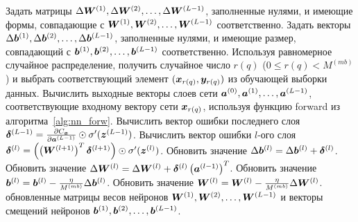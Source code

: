 \documentclass[a4paper,12pt,russian]{article} %
\begin{document}
\begin{algorithm}[t]
\begin{algorithmic}[1]
		\State Задать матрицы $\Delta \bm{W}^{(1)}, \Delta  \bm{W}^{(2)}, \ldots, \Delta \bm{W}^{(L-1)}$, заполненные нулями, и имеющие формы, совпадающие с $\bm{W}^{(1)}, \bm{W}^{(2)}, \ldots, \bm{W}^{(L-1)}$ соответственно.
		\State Задать векторы $\Delta \bm{b}^{(1)}, \Delta  \bm{b}^{(2)}, \ldots, \Delta \bm{b}^{(L-1)}$, заполненные нулями, и имеющие размер, совпадающий с $\bm{b}^{(1)}, \bm{b}^{(2)}, \ldots, \bm{b}^{(L-1)}$ соответственно.
			\State Используя равномерное случайное распределение, получить случайное число $r(q)$ ($0 \leq r(q) < M^{(mb)}$) и выбрать соответствующий элемент $(\bm{x}_{r(q)}, \bm{y}_{r(q)})$ из обучающей выборки данных.
			\State Вычислить выходные векторы слоев сети $\bm{a}^{(0)}, \bm{a}^{(1)}, \ldots, \bm{a}^{(L-1)}$, соответствующие входному вектору сети $\bm{x}_{r(q)}$, используя функцию forward из алгоритма~\ref{alg:nn_forw}.
			\State Вычислить вектор ошибки последнего слоя 
			$\bm{\delta}^{(L-1)} = \frac{\partial C_{\bm{x}}}{\partial \bm{a}^{(L-1)}} \odot \sigma'(\bm{z}^{(L-1)})$.
				\State Вычислить вектор ошибки $l$-ого слоя 
				$\bm{\delta}^{(l)} = \left( \left( \bm{W}^{(l+1)} \right)^T \bm{\delta}^{(l+1)} \right) \odot \sigma'(\bm{z}^{(l)})$.
				\State Обновить значение 
				$\Delta \bm{b}^{(l)} = \Delta \bm{b}^{(l)}  + \bm{\delta}^{(l)}$.
				\State Обновить значение 
				$\Delta \bm{W}^{(l)} = \Delta \bm{W}^{(l)}  + \bm{\delta}^{(l)} \left( \bm{a}^{(l-1)} \right)^T$.
			\EndFor
		\EndFor
			\State Обновить значение $\bm{b}^{(l)} = \bm{b}^{(l)} - \frac{\eta}{M^{(mb)}} \Delta \bm{b}^{(l)}$.
			\State Обновить значение $\bm{W}^{(l)} = \bm{W}^{(l)} - \frac{\eta}{M^{(mb)}} \Delta \bm{W}^{(l)}$.
		\EndFor
		\Ensure обновленные матрицы весов нейронов $\bm{W}^{(1)}, \bm{W}^{(2)}, \ldots, \bm{W}^{(L-1)}$ и векторы смещений нейронов $\bm{b}^{(1)}, \bm{b}^{(2)}, \ldots, \bm{b}^{(L-1)}$.
	\end{algorithmic}
\end{algorithm}
\end{document}
